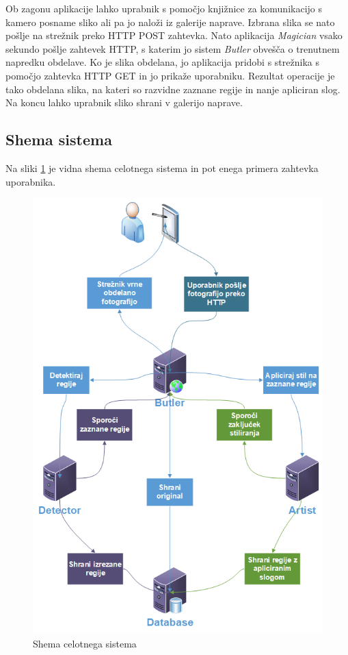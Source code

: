\documentclass[runningheads,a4paper]{llncs}
\begin{document}
Ob zagonu aplikacije lahko uprabnik s pomočjo knjižnice za komunikacijo s kamero \cite{camera-view} posname sliko ali pa jo naloži iz galerije naprave. Izbrana slika se nato pošlje na strežnik preko HTTP POST zahtevka. Nato aplikacija \textit{Magician} vsako sekundo pošlje zahtevek HTTP, s katerim jo sistem \textit{Butler} obvešča o trenutnem napredku obdelave. Ko je slika obdelana, jo aplikacija pridobi s strežnika s pomočjo zahtevka HTTP GET in jo prikaže uporabniku. Rezultat operacije je tako obdelana slika, na kateri so razvidne zaznane regije in nanje apliciran slog. Na koncu lahko uprabnik sliko shrani v galerijo naprave.

\subsection{Shema sistema}
Na sliki \ref{fig:system_scheme} je vidna shema celotnega sistema in pot enega primera zahtevka uporabnika.

\begin{figure}[H]
\centering
\includegraphics[width=135mm, center]{figures/vzorec.png}
\caption{Shema celotnega sistema}
\label{fig:system_scheme}
\end{figure}
\end{document}
